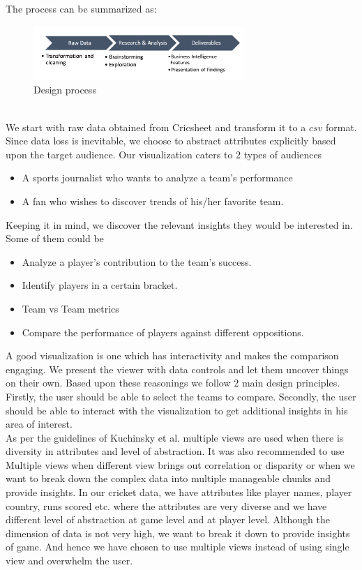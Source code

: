 \documentclass[10pt,journal,compsoc]{IEEEtran}
\begin{document}
\noindent The process can be summarized as:
\begin{figure}[ht]
\includegraphics[width=8cm]{design_process.png}
\caption{Design process}
\end{figure}\\
\indent We start with raw data obtained from Cricsheet\cite{cricsheet} and transform it to a $csv$ format. Since data loss is inevitable, we choose to abstract attributes explicitly based upon the target audience. Our visualization caters to $2$ types of audiences
\begin{itemize}
\item A sports journalist who wants to analyze a team’s performance
\item A fan who wishes to discover trends of his/her favorite team.
\end{itemize}
Keeping it in mind, we discover the relevant insights they would be interested in. Some of them could be
\begin{itemize}
\item Analyze a player’s contribution to the team’s success.
\item Identify players in a certain bracket.
\item Team vs Team metrics
\item Compare the performance of players against different oppositions.
\end{itemize} 
\indent A good visualization is one which has interactivity and makes the comparison engaging. We present the viewer with data controls and let them uncover things on their own. Based upon these reasonings we follow $2$ main design principles. Firstly, the user should be able to select the teams to compare. Secondly, the user should be able to interact with the visualization to get additional insights in his area of interest.\\

\indent As per the guidelines of Kuchinsky et al. \cite{multipleviews} multiple views are used when there is diversity in attributes and level of abstraction. It was also recommended to use Multiple views when different view brings out correlation or disparity or when we want to break down the complex data into multiple manageable chunks and provide insights. In our cricket data, we have attributes like player names, player country, runs scored etc. where the attributes are very diverse and we have different level of abstraction at game level and at player level. Although the dimension of data is not very high, we want to break it down to provide insights of game. And hence we have chosen to use multiple views instead of using single view and overwhelm the user.\\
\end{document}
